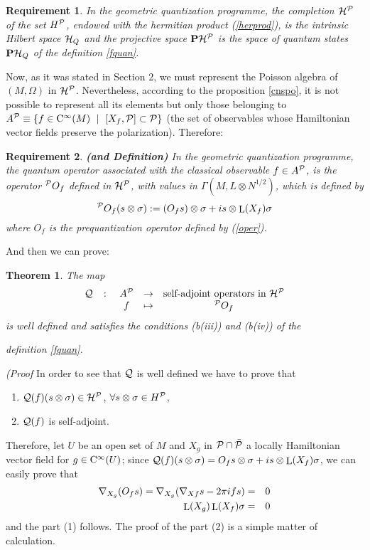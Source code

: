 \documentclass[12pt]{article}
\theoremstyle{plain}
\newtheorem{teor}{Theorem}
\newtheorem{require}{Requirement}
\def\beann{\begin{eqnarray*}}
\def\eeann{\end{eqnarray*}}
\def\Lie{\mathop{\rm L}\nolimits}
\def\Cinfty{{\rm C}^\infty}
\begin{document}
\begin{require}
In the geometric quantization programme, the completion ${\cal H}^{\cal
P}$
of the set $H^{\cal P}$, endowed with the hermitian product
(\ref{herprod}), is the intrinsic Hilbert space ${\cal H}_Q$
and the projective space ${\bf P}{\cal H}^{\cal P}$
is the space of quantum states ${\bf P}{\cal H}_Q$ of the definition
\ref{fquan}.
\end{require}

Now, as it was stated in Section 2, we must represent the Poisson
algebra of
$(M,\Omega )$ in ${\cal H}^{\cal P}$.
Nevertheless, according to the proposition \ref{cnspo},
it is not possible to represent
all its elements but only those belonging to
$A^{\cal P} \equiv\{ f \in \Cinfty (M) \ \mid \ [X_f,\cal P] \subset
\cal P \}$
(the set of observables whose Hamiltonian vector fields preserve the
polarization).
Therefore:

\begin{require}
{\bf (and Definition)}
In the geometric quantization programme,
the quantum operator associated with the classical observable
$f \in A^{\cal P}$, is the operator $^{\cal P}O_f$ defined in ${\cal
H}^{\cal P}$,
with values in $\Gamma (M,L \otimes N^{1/2})$, which is defined by
$$
^{\cal P}O_f (s \otimes \sigma) :=
(O_f s)\otimes \sigma + i s \otimes \Lie(X_f)\sigma
$$
where $O_f$ is the prequantization operator defined by (\ref{oper}).
\end{require}

And then we can prove:

\begin{teor}
The map
$$
\begin{array}{ccccc}
{\cal Q} & \colon & A^{\cal P} & \to &
\mbox{{\rm self-adjoint operators in} ${\cal H}^{\cal P}$}
\\
& & f & \mapsto & ^{\cal P}O_f
\end{array}
$$
is well defined and satisfies the conditions (b(iii)) and (b(iv)) of the

definition \ref{fquan}.
\end{teor}
{\it (Proof} \quad
In order to see that ${\cal Q}$ is well defined we have to prove that
\begin{enumerate}
\item
${\cal Q}(f)(s \otimes \sigma) \in {\cal H}^{\cal P}$,
$\forall s \otimes \sigma\in H^{\cal P}$,
\item
${\cal Q}(f)$ is self-adjoint.
\end{enumerate}
Therefore, let $U$ be an open set of $M$ and $X_g$ in ${\cal P}
\cap \bar {\cal P}$ a locally Hamiltonian vector field for $g \in
\Cinfty (U)$;
 since ${\cal Q}(f)(s \otimes \sigma)
 =O_f s \otimes\sigma + i s \otimes
\Lie(X_f)\sigma$, we can easily prove that \beann \nabla_{X_g}(O_f
s) = \nabla_{X_g}(\nabla_{Xf}s-2 \pi i f s) &=& 0
\\
\Lie(X_g)\Lie(X_f)\sigma &=& 0
\eeann
and the part (1) follows. The proof of the part (2) is a simple matter
of calculation.
\end{document}
